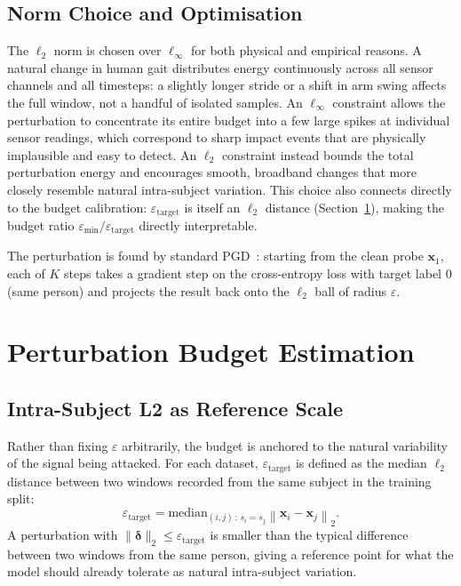 \subsection{Norm Choice and Optimisation}
\label{ssec:ev_pgd}

The $\ell_2$ norm is chosen over $\ell_\infty$ for both physical and empirical reasons. A natural change in human gait distributes energy continuously across all sensor channels and all timesteps: a slightly longer stride or a shift in arm swing affects the full window, not a handful of isolated samples. An $\ell_\infty$ constraint allows the perturbation to concentrate its entire budget into a few large spikes at individual sensor readings, which correspond to sharp impact events that are physically implausible and easy to detect. An $\ell_2$ constraint instead bounds the total perturbation energy and encourages smooth, broadband changes that more closely resemble natural intra-subject variation. This choice also connects directly to the budget calibration: $\varepsilon_\text{target}$ is itself an $\ell_2$ distance (Section~\ref{sec:ev_budget}), making the budget ratio $\varepsilon_\text{min}/\varepsilon_\text{target}$ directly interpretable.

The perturbation is found by standard PGD~\cite{madry2018towards}: starting from the clean probe $\mathbf{x}_1$, each of $K$ steps takes a gradient step on the cross-entropy loss with target label 0 (same person) and projects the result back onto the $\ell_2$ ball of radius $\varepsilon$.

\section{Perturbation Budget Estimation}
\label{sec:ev_budget}

\subsection{Intra-Subject L2 as Reference Scale}
\label{ssec:ev_l2}

Rather than fixing $\varepsilon$ arbitrarily, the budget is anchored to the natural variability of the signal being attacked. For each dataset, $\varepsilon_\text{target}$ is defined as the median $\ell_2$ distance between two windows recorded from the same subject in the training split:
\begin{equation}
  \varepsilon_\text{target}
  = \mathrm{median}_{(i,j)\,:\,s_i = s_j}
    \left\| \mathbf{x}_i - \mathbf{x}_j \right\|_2.
\end{equation}
A perturbation with $\|\boldsymbol{\delta}\|_2 \leq \varepsilon_\text{target}$ is smaller than the typical difference between two windows from the same person, giving a reference point for what the model should already tolerate as natural intra-subject variation.

